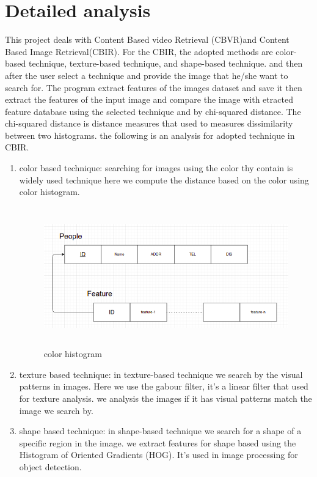 \documentclass[pdftex,10pt,a4paper,oneside]{article}
\begin{document}
	\pagebreak
	\section{Detailed analysis}
	This project deals with Content Based video Retrieval (CBVR)and Content Based Image Retrieval(CBIR). 
	For the CBIR, the adopted methods are color-based technique, texture-based technique, and shape-based technique. and then after the user select a technique and provide the image that he/she want to search for. The program extract features of the images dataset and save it then extract the features of the input image and compare the image with etracted feature database using the selected technique and by chi-squared distance. The chi-squared distance is distance measures that used to measures dissimilarity between two histograms. the following is an analysis for adopted technique in CBIR.
	\begin{enumerate}
		\item color based technique: searching for images using the color thy contain is widely used technique here we compute the distance based on the color using color histogram.
	
		\begin{figure}[H]
			\centering
			\includegraphics[width=120mm,height=60mm]{fig/24.png}
			\caption{color histogram  }
			\label{color histogram }
		\end{figure}
		\item texture based technique: in texture-based technique we search by the visual patterns in images. Here we use the gabour filter, it's a linear filter that used for texture analysis. we analysis the images if it has visual patterns match the image we search by.
		
		\item shape based technique: in shape-based technique we search for a shape of a specific region in the image. we extract features for shape based using the Histogram of Oriented Gradients (HOG). It's used in image processing for object detection.
	\end{enumerate}
\end{document}
